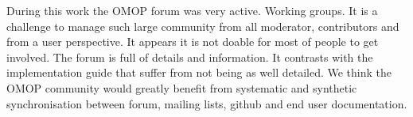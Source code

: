 During this work the OMOP forum was very active. Working groups.  It is a
challenge to manage such large community from all moderator, contributors and
from a user perspective. It appears it is not doable for most of people to get
involved. The forum is full of details and information. It contrasts with the
implementation guide that suffer from not being as well detailed. We think the
OMOP community would greatly benefit from systematic and synthetic
synchronisation between forum, mailing lists,  github and end user
documentation.
